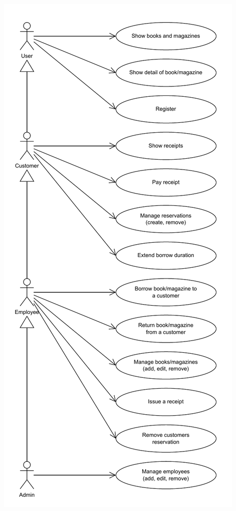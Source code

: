 \documentclass{article}
\begin{document}
\begin{center}
    \includegraphics*[height=0.95\textheight]{assets/usecase.pdf}
\end{center}
\end{document}
